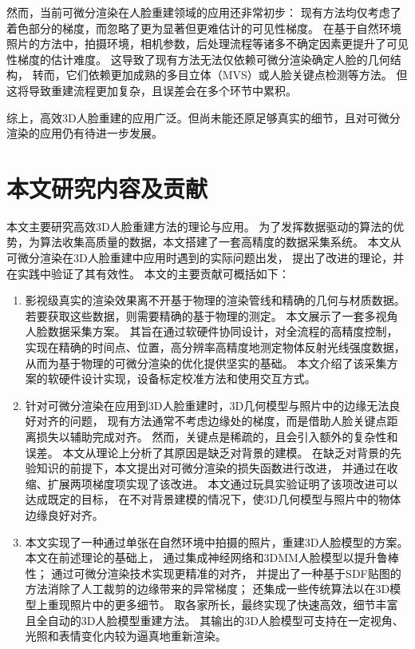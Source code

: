 然而，当前可微分渲染在人脸重建领域的应用还非常初步：
现有方法均仅考虑了着色部分的梯度，而忽略了更为显著但更难估计的可见性梯度。
在基于自然环境照片的方法中，拍摄环境，相机参数，后处理流程等诸多不确定因素更提升了可见性梯度的估计难度。
这导致了现有方法无法仅依赖可微分渲染确定人脸的几何结构，
转而，它们依赖更加成熟的多目立体（MVS）或人脸关键点检测等方法。
但这将导致重建流程更加复杂，且误差会在多个环节中累积。

综上，高效3D人脸重建的应用广泛。但尚未能还原足够真实的细节，且对可微分渲染的应用仍有待进一步发展。

\section{本文研究内容及贡献}

本文主要研究高效3D人脸重建方法的理论与应用。
为了发挥数据驱动的算法的优势，为算法收集高质量的数据，本文搭建了一套高精度的数据采集系统。
本文从可微分渲染在3D人脸重建中应用时遇到的实际问题出发，
提出了改进的理论，并在实践中验证了其有效性。
本文的主要贡献可概括如下：

\begin{enumerate}
\item 影视级真实的渲染效果离不开基于物理的渲染管线和精确的几何与材质数据。
若要获取这些数据，则需要精确的基于物理的测定。
本文展示了一套多视角人脸数据采集方案。
其旨在通过软硬件协同设计，对全流程的高精度控制，实现在精确的时间点、位置，高分辨率高精度地测定物体反射光线强度数据，
从而为基于物理的可微分渲染的优化提供坚实的基础。
本文介绍了该采集方案的软硬件设计实现，设备标定校准方法和使用交互方式。

\item 针对可微分渲染在应用到3D人脸重建时，3D几何模型与照片中的边缘无法良好对齐的问题，
现有方法\citep{deep3d}通常不考虑边缘处的梯度，而是借助人脸关键点距离损失以辅助完成对齐。
然而，关键点是稀疏的，且会引入额外的复杂性和误差。
本文从理论上分析了其原因是缺乏对背景的建模。
在缺乏对背景的先验知识的前提下，本文提出对可微分渲染的损失函数进行改进，
并通过在收缩、扩展两项梯度项实现了该改进。
本文通过玩具实验证明了该项改进可以达成既定的目标，
在不对背景建模的情况下，使3D几何模型与照片中的物体边缘良好对齐。

\item 本文实现了一种通过单张在自然环境中拍摄的照片，重建3D人脸模型的方案。
本文在前述理论的基础上，
通过集成神经网络和3DMM人脸模型以提升鲁棒性；
通过可微分渲染技术实现更精准的对齐，
并提出了一种基于SDF贴图的方法消除了人工裁剪的边缘带来的异常梯度；
还集成一些传统算法以在3D模型上重现照片中的更多细节。
取各家所长，最终实现了快速高效，细节丰富且全自动的3D人脸模型重建方法。
其输出的3D人脸模型可支持在一定视角、光照和表情变化内较为逼真地重新渲染。

\end{enumerate}

